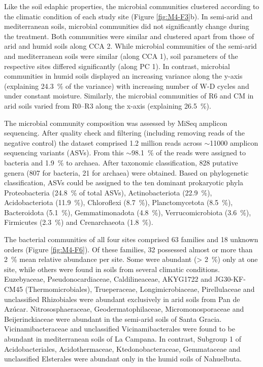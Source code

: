Like the soil edaphic properties, the microbial communities clustered according to the climatic condition of each study site (Figure \ref{fig:M4-F3}b). In semi-arid and mediterranean soils, microbial communities did not significantly change during the treatment. Both communities were similar and clustered apart from those of arid and humid soils along CCA 2. While microbial communities of the semi-arid and mediterranean soils were similar (along CCA 1), soil parameters of the respective sites differed significantly (along PC 1). In contrast, microbial communities in humid soils displayed an increasing variance along the y-axis (explaining \SI{24.3}{\percent} of the variance) with increasing number of W-D cycles and under constant moisture. Similarly, the microbial communities of R6 and CM in arid soils varied from R0--R3 along the x-axis (explaining \SI{26.5}{\percent}).

The microbial community composition was assessed by MiSeq amplicon sequencing. After quality check and filtering (including removing reads of the negative control) the dataset comprised 1.2 million reads across \(\sim\)\num{11000} amplicon sequencing variants (ASVs). From this \(\sim\)\SI{98.1}{\percent} of the reads were assigned to bacteria and \SI{1.9}{\percent} to archaea. After taxonomic classification, 828 putative genera (807 for bacteria, 21 for archaea) were obtained. Based on phylogenetic classification, ASVs could be assigned to the ten dominant prokaryotic phyla Proteobacteria (\SI{24.8}{\percent} of total ASVs), Actinobacteriota (\SI{22.9}{\percent}), Acidobacteriota (\SI{11.9}{\percent}), Chloroflexi (\SI{8.7}{\percent}), Planctomycetota (\SI{8.5}{\percent}), Bacteroidota (\SI{5.1}{\percent}), Gemmatimonadota (\SI{4.8}{\percent}), Verrucomicrobiota (\SI{3.6}{\percent}), Firmicutes (\SI{2.3}{\percent}) and Crenarchaeota (\SI{1.8}{\percent}).

The bacterial communities of all four sites comprised 63 families and 18 unknown orders (Figure \ref{fig:M4-F6}). 
Of these families, 32 possessed almost or more than \SI{2}{\percent} mean relative abundance per site. 
Some were abundant (\SI{> 2}{\percent}) only at one site, while others were found in soils from several climatic conditions. 
Euzebyaceae, Pseudonocardiaceae, Caldilineaceae, AKYG1722 and JG30-KF-CM45 (Thermomicrobiales), Trueperaceae, Longimicrobiaceae, Pirellulaceae and unclassified Rhizobiales were abundant exclusively in arid soils from Pan de Az{\'u}car. 
Nitrososphaeraceae, Geodermatophilaceae, Micromonosporaceae and Beijerinckiaceae were abundant in the semi-arid soils of Santa Gracia. 
Vicinamibacteraceae and unclassified Vicinamibacterales were found to be abundant in mediterranean soils of La Campana. 
In contrast, Subgroup 1 of Acidobacteriales, Acidothermaceae, Ktedonobacteraceae, Gemmataceae and unclassified Elsterales were abundant only in the humid soils of Nahuelbuta.

